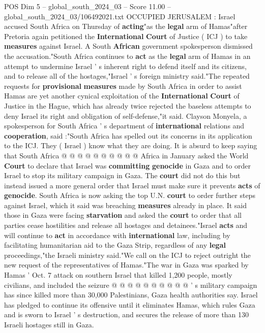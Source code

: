 \begin{textsample}{POS Dim 5 – global\_south\_2024\_03 – Score 11.00 – global\_south\_2024\_03/106492021.txt}  \label{ex:f5_pos_248}
OCCUPIED JERUSALEM : Israel accused South Africa on Thursday of \textbf{acting}"as the \textbf{legal} arm of Hamas"after Pretoria again petitioned the \textbf{International} \textbf{Court} of Justice ( ICJ ) to take \textbf{measures} against Israel.
A South \textbf{African} government spokesperson dismissed the accusation."South Africa continues to \textbf{act} as the \textbf{legal} arm of Hamas in an attempt to undermine Israel ' s inherent right to defend itself and its citizens, and to release all of the hostages,"Israel ' s foreign ministry said."The repeated requests for \textbf{provisional} \textbf{measures} made by South Africa in order to assist Hamas are yet another cynical exploitation of the \textbf{International} \textbf{Court} of Justice in the Hague, which has already twice rejected the baseless attempts to deny Israel its right and obligation of self-defense,"it said.
Clayson Monyela, a spokesperson for South Africa ' s department of \textbf{international} relations and \textbf{cooperation}, said :"South Africa has spelled out its concerns in its application to the ICJ.
They ( Israel ) know what they are doing.
It is absurd to keep saying that South Africa @ @ @ @ @ @ @ @ @ @ Africa in January asked the World \textbf{Court} to declare that Israel was \textbf{committing} \textbf{genocide} in Gaza and to order Israel to stop its military campaign in Gaza.
The \textbf{court} did not do this but instead issued a more general order that Israel must make sure it prevents \textbf{acts} of \textbf{genocide}.
South Africa is now asking the top U.N. \textbf{court} to order further steps against Israel, which it said was breaching \textbf{measures} already in place.
It said those in Gaza were facing \textbf{starvation} and asked the \textbf{court} to order that all parties cease hostilities and release all hostages and detainees."Israel \textbf{acts} and will continue to \textbf{act} in accordance with \textbf{international} law, including by facilitating humanitarian aid to the Gaza Strip, regardless of any \textbf{legal} proceedings,"the Israeli ministry said."We call on the ICJ to reject outright the new request of the representatives of Hamas."The war in Gaza was sparked by Hamas ' Oct. 7 attack on southern Israel that killed 1,200 people, mostly civilians, and included the seizure @ @ @ @ @ @ @ @ @ @ ' s military campaign has since killed more than 30,000 Palestinians, Gaza health authorities say.
Israel has pledged to continue its offensive until it eliminates Hamas, which rules Gaza and is sworn to Israel ' s destruction, and secures the release of more than 130 Israeli hostages still in Gaza.

\end{textsample}
